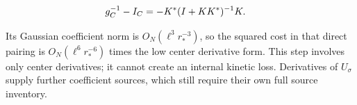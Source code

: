 \begin{gather*}
\begin{aligned}
& g_{C}^{-1}-I_{C}=-K^{*}(I+K K^{*})^{-1}K.
\end{aligned}\notag
\end{gather*}

Its Gaussian coefficient norm is \(O_{N}(\ell ^{3} r_{*}^{-3})\), so the
squared cost in that direct pairing is \(O_{N}(\ell ^{6} r_{*}^{-6})\)
times the low center derivative form. This step involves only center
derivatives; it cannot create an internal kinetic loss. Derivatives of
\(U_{\sigma}\) supply further coefficient sources, which still require
their own full source inventory.

